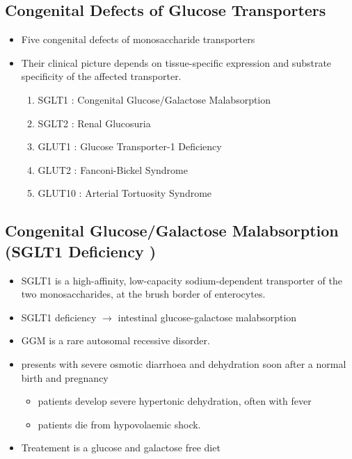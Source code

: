\documentclass{scrartcl}
\begin{document}
\subsection{Congenital Defects of Glucose Transporters}
\label{sec:orgfd5a9a1}
\begin{itemize}
\item Five congenital defects of monosaccharide transporters
\item Their clinical picture depends on tissue-specific expression and
substrate specificity of the affected transporter.

\begin{enumerate}
\item SGLT1 : Congenital Glucose/Galactose Malabsorption
\item SGLT2 : Renal Glucosuria
\item GLUT1 : Glucose Transporter-1 Deficiency
\item GLUT2 : Fanconi-Bickel Syndrome
\item GLUT10 : Arterial Tortuosity Syndrome
\end{enumerate}
\end{itemize}

\subsection{Congenital Glucose/Galactose Malabsorption (SGLT1 Deficiency )}
\label{sec:org981a609}

\begin{itemize}
\item SGLT1 is a high-affinity, low-capacity sodium-dependent transporter
of the two monosaccharides, at the brush border of enterocytes.

\item SGLT1 deficiency \(\to\) intestinal glucose-galactose malabsorption
\item GGM is a rare autosomal recessive disorder.

\item presents with severe osmotic diarrhoea and dehydration soon after a
normal birth and pregnancy
\begin{itemize}
\item patients develop severe hypertonic dehydration, often with fever
\item patients die from hypovolaemic shock.
\end{itemize}

\item Treatement is a glucose and galactose free diet
\end{itemize}
\end{document}
